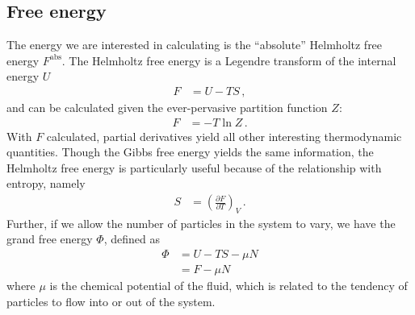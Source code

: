 \documentclass[12pt]{article}
\begin{document}
\subsection{Free energy}
The energy we are interested in calculating is the ``absolute'' Helmholtz free energy $F^{\text{abs}}$. The Helmholtz free energy is a Legendre transform of the internal energy $U$
\begin{align}
    F &= U - TS\, ,
    \label{Fdef}
\end{align}
and can be calculated given the ever-pervasive partition function $Z$:
\begin{align}
    F &= -T \ln Z\, .
    \label{FdefSM}
\end{align}
With $F$ calculated, partial derivatives yield all other interesting thermodynamic quantities. Though the Gibbs free energy yields the same information, the Helmholtz free energy is particularly useful because of the relationship with entropy, namely
\begin{align}
    S &= \left(\frac{\partial F}{\partial T}\right)_{V}\, .
\end{align}
Further, if we allow the number of particles in the system to vary, we have the grand free energy $\Phi$, defined as
\begin{align}
    \Phi &= U-TS-\mu N\\
    &= F - \mu N
    \label{Phidef}
\end{align}
where $\mu$ is the chemical potential of the fluid, which is related to the tendency of particles to flow into or out of the system.\\
\end{document}
